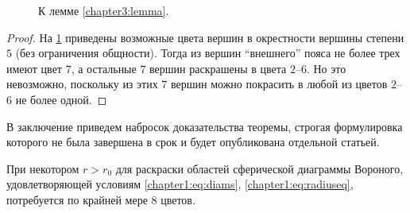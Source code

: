 \begin{figure}[h]
\centering
\captionsetup{justification=centering}
\caption{К лемме \ref{chapter3:lemma}.}
\label{chapter3:fig:lemma}
\end{figure}

\begin{proof}
На \figurename{ \ref{chapter3:fig:lemma}} приведены возможные цвета вершин в окрестности вершины степени $5$ (без ограничения общности). 
Тогда из вершин \enquote{внешнего} пояса не более трех имеют цвет $7$, а остальные $7$ вершин раскрашены в цвета $2$--$6$. Но это невозможно, поскольку из этих $7$ вершин можно покрасить в любой из цветов $2$--$6$ не более одной. 
\end{proof}

В заключение приведем набросок доказательства теоремы, 
строгая формулировка которого не была завершена в срок и будет опубликована отдельной статьей.

\begin{theorem}
При некотором $r>r_0$ для раскраски областей сферической диаграммы Вороного,
удовлетворяющей условиям \ref{chapter1:eq:diams}, \ref{chapter1:eq:radiuseq}, 
потребуется по крайней мере $8$ цветов.
\end{theorem}

